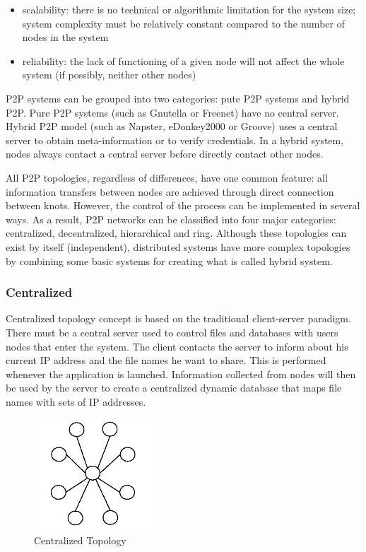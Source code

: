 \begin{itemize}
  \item scalability: there is no technical or algorithmic limitation for the
  system size; system complexity must be relatively constant compared to the
  number of nodes in the system
  \item reliability: the lack of functioning of a given node will not affect
  the whole system (if possibly, neither other nodes)
\end{itemize}

P2P systems can be grouped into two categories: pute P2P systems and hybrid P2P.
Pure P2P systems (such as Gnutella or Freenet) have no central server. Hybrid
P2P model (such as Napster, eDonkey2000 or Groove) uses a central server to
obtain meta-information or to verify credentials. In a hybrid system, nodes
always contact a central server before directly contact other nodes.

All P2P topologies, regardless of differences, have one common feature: all
information transfers between nodes are achieved through direct connection
between knots. However, the control of the process can be implemented in several
ways. As a result, P2P networks can be classified into four major categories:
centralized, decentralized, hierarchical and ring. Although these topologies
can exist by itself (independent), distributed systems have more complex
topologies by combining some basic systems for creating what is called hybrid
system.

\subsubsection{Centralized}

Centralized topology concept is based on the traditional client-server paradigm.
There must be a central server used to control files and databases with users
nodes that enter the system. The client contacts the server to inform about his
current IP address and the file names he want to share. This is performed
whenever the application is launched. Information collected from nodes will then
be used by the server to create a centralized dynamic database that maps file
names with sets of IP addresses.

\begin{figure}
  \centering
  \includegraphics[width=0.4\textwidth]{src/img/p2p-systems/centralized}
  \caption{Centralized Topology}
  \label{fig:p2p-systems:centralized}
\end{figure}

